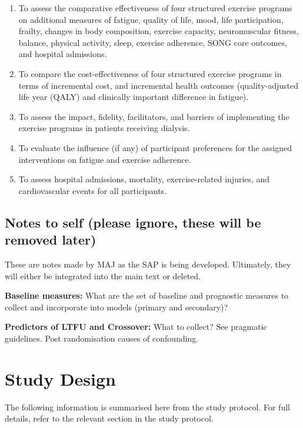\documentclass[
]{article}
\begin{document}
\begin{enumerate}
  \def\labelenumi{\arabic{enumi}.}
  \item To assess the comparative effectiveness of four structured exercise programs on additional measures of fatigue, quality of life, mood, life participation, frailty, changes in body composition, exercise capacity, neuromuscular fitness, balance, physical activity, sleep, exercise adherence, SONG core outcomes, and hospital admissions.
  \item To compare the cost-effectiveness of four structured exercise programs in terms of incremental cost, and incremental health outcomes (quality-adjusted life year (QALY) and clinically important difference in fatigue).
  \item To assess the impact, fidelity, facilitators, and barriers of implementing the exercise programs in patients receiving dialysis.
  \item To evaluate the influence (if any) of participant preferences for the assigned interventions on fatigue and exercise adherence.
  \item To assess hospital admissions, mortality, exercise-related injuries, and cardiovascular events for all participants.
\end{enumerate}


\clearpage

\hypertarget{to-be-discussed}{%
  \subsection{Notes to self (please ignore, these will be removed later)}\label{to-be-discussed}}

These are notes made by MAJ as the SAP is being developed.
Ultimately, they will either be integrated into the main text or deleted.

\textbf{Baseline measures:} What are the set of baseline and prognostic measures to collect and incorporate into models (primary and secondary)?

\textbf{Predictors of LTFU and Crossover:} What to collect?
See pragmatic guidelines.
Post randomisation causes of confounding.


\clearpage

\hypertarget{study-design}{%
  \section{Study Design}\label{study-design}}

The following information is summarised here from the study protocol.
For full details, refer to the relevant section in the study protocol.
\end{document}
